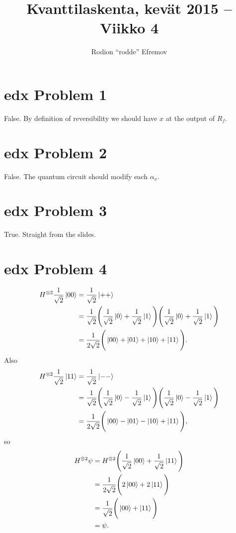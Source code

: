 \documentclass[10pt]{article}
\title{Kvanttilaskenta, kevät 2015 -- Viikko 4}
\author{Rodion ``rodde'' Efremov}
\begin{document}
 \maketitle

\section*{edx Problem 1}
False. By definition of reversibility we should have $x$ at the output of $R_f$.

\section*{edx Problem 2}
False. The quantum circuit should modify each $\alpha_x$.

\section*{edx Problem 3}
True. Straight from the slides.

\section*{edx Problem 4}
\begin{align*}
H^{\otimes 2} \frac{1}{\sqrt{2}} \ket{00} &= \frac{1}{\sqrt{2}} \ket{++} \\
                                        						&= \frac{1}{\sqrt{2}} \Bigg( \frac{1}{\sqrt{2}} \ket{0} + \frac{1}{\sqrt{2}} \ket{1} \Bigg)\Bigg( \frac{1}{\sqrt{2}} \ket{0} + \frac{1}{\sqrt{2}} \ket{1} \Bigg) \\
                                        						&= \frac{1}{2\sqrt{2}} \Bigg( \ket{00} + \ket{01} + \ket{10} + \ket{11} \Bigg).
\end{align*}
Also
\begin{align*}
H^{\otimes 2} \frac{1}{\sqrt{2}} \ket{11} &= \frac{1}{\sqrt{2}} \ket{--} \\
                                        						&= \frac{1}{\sqrt{2}} \Bigg( \frac{1}{\sqrt{2}} \ket{0} - \frac{1}{\sqrt{2}} \ket{1} \Bigg)\Bigg( \frac{1}{\sqrt{2}} \ket{0} - \frac{1}{\sqrt{2}} \ket{1} \Bigg) \\
                                        						&= \frac{1}{2\sqrt{2}} \Bigg( \ket{00} - \ket{01} - \ket{10} + \ket{11} \Bigg),
\end{align*}
so
\begin{align*}
H^{\otimes 2}\psi &= H^{\otimes 2}\Bigg( \frac{1}{\sqrt{2}} \ket{00} + \frac{1}{\sqrt{2}} \ket{11} \Bigg) \\
 							  &= \frac{1}{2\sqrt{2}} \Bigg( 2\ket{00}  + 2\ket{11} \Bigg) \\
 							  &= \frac{1}{\sqrt{2}} \Bigg( \ket{00}  + \ket{11} \Bigg) \\
 							  &= \psi.
\end{align*}
\end{document}
